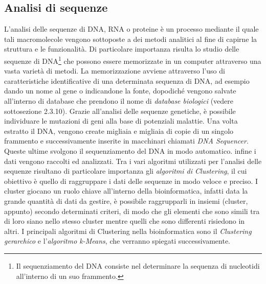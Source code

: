 \subsection{Analisi di sequenze}
L'analisi delle sequenze di DNA, RNA o proteine è un processo mediante il quale tali macromolecole vengono sottoposte a dei metodi analitici al fine di capirne la struttura e le funzionalità.
\newline
Di particolare importanza risulta lo studio delle sequenze di DNA\footnote{Il sequenziamento del DNA consiste nel determinare la sequenza di nucleotidi all'interno di un suo frammento.} che possono essere memorizzate in un computer attraverso una vasta varietà di metodi.
La memorizzazione avviene attraverso l'uso di caratteristiche identificative di una determinata sequenza di DNA, ad esempio dando un nome al gene o indicandone la fonte, dopodiché vengono salvate all'interno di database che prendono il nome di \textit{database biologici} (vedere sottosezione 2.3.10).
\newline
Grazie all'analisi delle sequenze genetiche, è possibile individuare le mutazioni di geni alla base di potenziali malattie.
\newline
Una volta estratto il DNA, vengono create migliaia e migliaia di copie di un singolo frammento e successivamente inserite in macchinari chiamati \textit{DNA Sequencer}. Queste ultime svolgono il sequenziamento del DNA in modo automatico. infine i dati vengono raccolti ed analizzati.
\newline
Tra i vari algoritmi utilizzati per l'analisi delle sequenze risultano di particolare importanza gli \textit{algoritmi di Clustering}, il cui obiettivo è quello di raggruppare i dati delle sequenze in modo veloce e preciso. I cluster giocano un ruolo chiave all'interno della bioinformatica, infatti data la grande quantità di dati da gestire, è possibile raggrupparli in insiemi (cluster, appunto) secondo determinati criteri, di modo che gli elementi che sono simili tra di loro siano nello stesso cluster mentre quelli che sono differenti risiedono in altri. I principali algoritmi di Clustering nella bioinformatica sono il \textit{Clustering gerarchico} e l'\textit{algoritmo k-Means}, che verranno spiegati successivamente.


